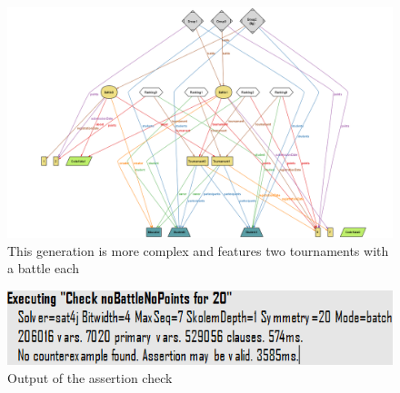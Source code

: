 \documentclass[12pt, a4paper]{report}
\begin{document}
\begin{figure}[H]
    \centering
    \includegraphics[width=0.8\linewidth]{images/alloyGen1.png}
    \caption{This generation is more complex and features two tournaments with a battle each}
\end{figure}
\begin{figure}[H]
    \centering
    \includegraphics[width=0.5\linewidth]{images/marta.png}
    \caption{Output of the assertion check}
\end{figure}
\end{document}
